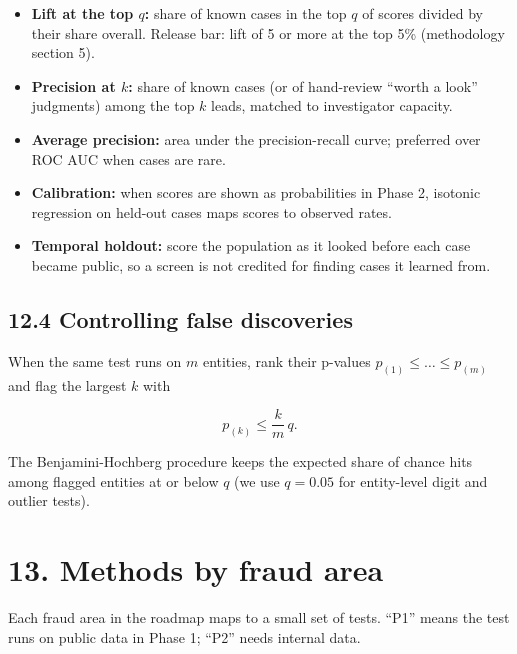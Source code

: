 \documentclass[letterpaper,11pt]{article}
\providecommand{\tightlist}{\setlength{\itemsep}{0pt}\setlength{\parskip}{0pt}}
\begin{document}
\begin{itemize}
\tightlist
\item
  \textbf{Lift at the top \(q\):} share of known cases in the top \(q\)
  of scores divided by their share overall. Release bar: lift of 5 or
  more at the top 5\% (methodology section 5).
\item
  \textbf{Precision at \(k\):} share of known cases (or of hand-review
  ``worth a look'' judgments) among the top \(k\) leads, matched to
  investigator capacity.
\item
  \textbf{Average precision:} area under the precision-recall curve;
  preferred over ROC AUC when cases are rare.
\item
  \textbf{Calibration:} when scores are shown as probabilities in Phase
  2, isotonic regression on held-out cases maps scores to observed
  rates.
\item
  \textbf{Temporal holdout:} score the population as it looked before
  each case became public, so a screen is not credited for finding cases
  it learned from.
\end{itemize}

\hypertarget{controlling-false-discoveries}{%
\subsection*{12.4 Controlling false
discoveries}\label{controlling-false-discoveries}}

When the same test runs on \(m\) entities, rank their p-values
\(p_{(1)} \le \dots \le p_{(m)}\) and flag the largest \(k\) with

\[p_{(k)} \le \frac{k}{m}\, q.\]

The Benjamini-Hochberg procedure keeps the expected share of chance hits
among flagged entities at or below \(q\) (we use \(q = 0.05\) for
entity-level digit and outlier tests).

\hypertarget{methods-by-fraud-area}{%
\section*{13. Methods by fraud area}\label{methods-by-fraud-area}}

Each fraud area in the roadmap maps to a small set of tests. ``P1''
means the test runs on public data in Phase 1; ``P2'' needs internal
data.
\end{document}
